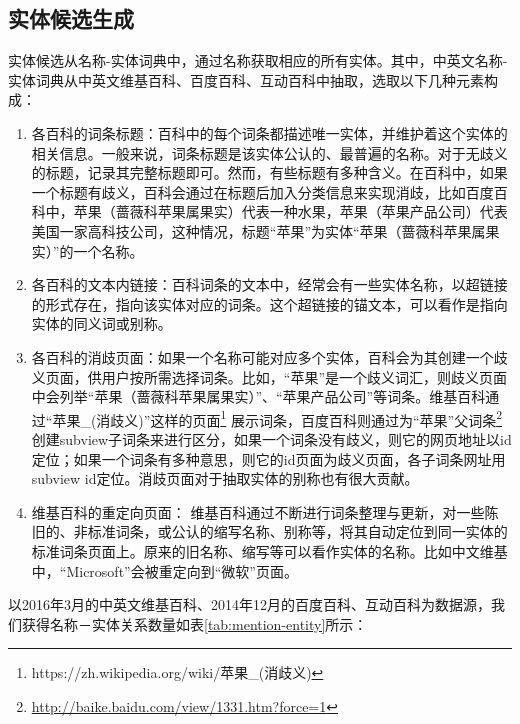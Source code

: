\subsection{实体候选生成}

实体候选从名称-实体词典中，通过名称获取相应的所有实体。其中，中英文名称-实体词典从中英文维基百科、百度百科、互动百科中抽取，选取以下几种元素构成：

\begin{enumerate}[1.]
\item 各百科的词条标题：百科中的每个词条都描述唯一实体，并维护着这个实体的相关信息。一般来说，词条标题是该实体公认的、最普遍的名称。对于无歧义的标题，记录其完整标题即可。然而，有些标题有多种含义。在百科中，如果一个标题有歧义，百科会通过在标题后加入分类信息来实现消歧，比如百度百科中，苹果（蔷薇科苹果属果实）代表一种水果，苹果（苹果产品公司）代表美国一家高科技公司，这种情况，标题“苹果”为实体“苹果（蔷薇科苹果属果实）”的一个名称。
\item 各百科的文本内链接：百科词条的文本中，经常会有一些实体名称，以超链接的形式存在，指向该实体对应的词条。这个超链接的锚文本，可以看作是指向实体的同义词或别称。
\item 各百科的消歧页面：如果一个名称可能对应多个实体，百科会为其创建一个歧义页面，供用户按所需选择词条。比如，“苹果”是一个歧义词汇，则歧义页面中会列举“苹果（蔷薇科苹果属果实）”、“苹果产品公司”等词条。维基百科通过“苹果\_(消歧义)”这样的页面\footnote{https://zh.wikipedia.org/wiki/苹果\_(消歧义)}
展示词条，百度百科则通过为“苹果”父词条\footnote{\url{http://baike.baidu.com/view/1331.htm?force=1}}创建subview子词条来进行区分，如果一个词条没有歧义，则它的网页地址以id定位；如果一个词条有多种意思，则它的id页面为歧义页面，各子词条网址用subview id定位。消歧页面对于抽取实体的别称也有很大贡献。
\item 维基百科的重定向页面： 维基百科通过不断进行词条整理与更新，对一些陈旧的、非标准词条，或公认的缩写名称、别称等，将其自动定位到同一实体的标准词条页面上。原来的旧名称、缩写等可以看作实体的名称。比如中文维基中，“Microsoft”会被重定向到“微软”页面。
\end{enumerate}

以2016年3月的中英文维基百科、2014年12月的百度百科、互动百科为数据源，我们获得名称－实体关系数量如表\ref{tab:mention-entity}所示：

